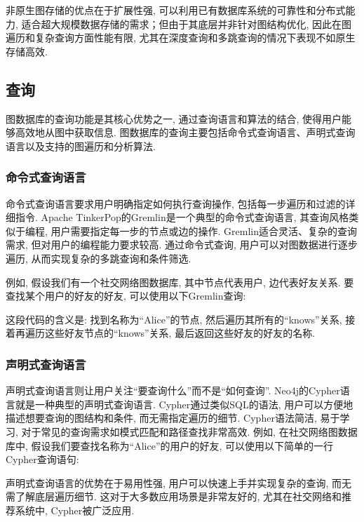 \documentclass[12pt,hyperref,a4paper,UTF8]{ctexart}
\begin{document}
非原生图存储的优点在于扩展性强, 可以利用已有数据库系统的可靠性和分布式能力, 适合超大规模数据存储的需求；但由于其底层并非针对图结构优化, 因此在图遍历和复杂查询方面性能有限, 尤其在深度查询和多跳查询的情况下表现不如原生存储高效.

\subsection{查询}

图数据库的查询功能是其核心优势之一, 通过查询语言和算法的结合, 使得用户能够高效地从图中获取信息. 图数据库的查询主要包括命令式查询语言、声明式查询语言以及支持的图遍历和分析算法.

\subsubsection*{命令式查询语言}

命令式查询语言要求用户明确指定如何执行查询操作, 包括每一步遍历和过滤的详细指令. Apache TinkerPop的Gremlin是一个典型的命令式查询语言, 其查询风格类似于编程, 用户需要指定每一步的节点或边的操作. Gremlin适合灵活、复杂的查询需求, 但对用户的编程能力要求较高. 通过命令式查询, 用户可以对图数据进行逐步遍历, 从而实现复杂的多跳查询和条件筛选.

例如, 假设我们有一个社交网络图数据库, 其中节点代表用户, 边代表好友关系. 要查找某个用户的好友的好友, 可以使用以下Gremlin查询:


这段代码的含义是: 找到名称为“Alice”的节点, 然后遍历其所有的“knows”关系, 接着再遍历这些好友节点的“knows”关系, 最后返回这些好友的好友的名称.

\subsubsection*{声明式查询语言}

声明式查询语言则让用户关注“要查询什么”而不是“如何查询”. Neo4j的Cypher语言就是一种典型的声明式查询语言. Cypher通过类似SQL的语法, 用户可以方便地描述想要查询的图结构和条件, 而无需指定遍历的细节. Cypher语法简洁, 易于学习, 对于常见的查询需求如模式匹配和路径查找非常高效. 例如, 在社交网络图数据库中, 假设我们要查找名称为“Alice”的用户的好友, 可以使用以下简单的一行Cypher查询语句:


声明式查询语言的优势在于易用性强, 用户可以快速上手并实现复杂的查询, 而无需了解底层遍历细节. 这对于大多数应用场景是非常友好的, 尤其在社交网络和推荐系统中, Cypher被广泛应用.
\end{document}
